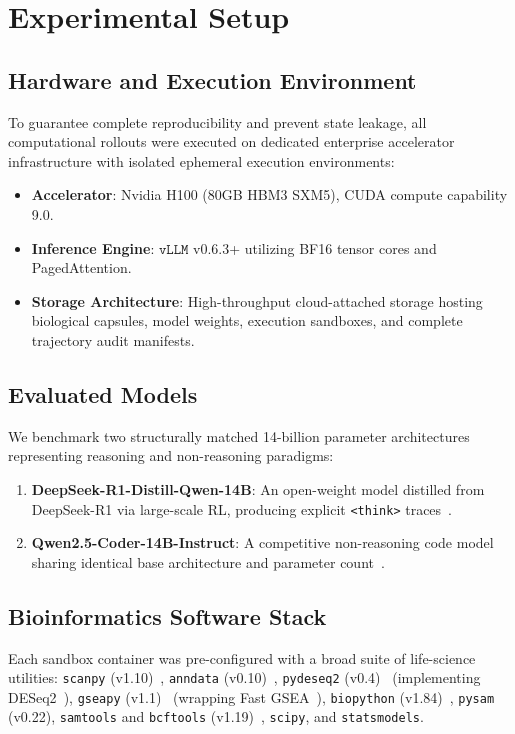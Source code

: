 \documentclass[11pt,letterpaper]{article}
\begin{document}
\section{Experimental Setup}

\subsection{Hardware and Execution Environment}
To guarantee complete reproducibility and prevent state leakage, all computational rollouts were executed on dedicated enterprise accelerator infrastructure with isolated ephemeral execution environments:
\begin{itemize}
    \item \textbf{Accelerator}: Nvidia H100 (80GB HBM3 SXM5), CUDA compute capability 9.0.
    \item \textbf{Inference Engine}: $\texttt{vLLM}$ v0.6.3+ utilizing BF16 tensor cores and PagedAttention.
    \item \textbf{Storage Architecture}: High-throughput cloud-attached storage hosting biological capsules, model weights, execution sandboxes, and complete trajectory audit manifests.
\end{itemize}

\subsection{Evaluated Models}
We benchmark two structurally matched 14-billion parameter architectures representing reasoning and non-reasoning paradigms:
\begin{enumerate}
    \item \textbf{DeepSeek-R1-Distill-Qwen-14B}: An open-weight model distilled from DeepSeek-R1 via large-scale RL, producing explicit \texttt{<think>} traces~\cite{guo2025deepseek}.
    \item \textbf{Qwen2.5-Coder-14B-Instruct}: A competitive non-reasoning code model sharing identical base architecture and parameter count~\cite{qwen2024coder}.
\end{enumerate}

\subsection{Bioinformatics Software Stack}
Each sandbox container was pre-configured with a broad suite of life-science utilities: \texttt{scanpy} (v1.10)~\cite{wolf2018scanpy}, \texttt{anndata} (v0.10)~\cite{virshup2021anndata}, \texttt{pydeseq2} (v0.4)~\cite{muzellec2023pydeseq2} (implementing DESeq2~\cite{love2014deseq2}), \texttt{gseapy} (v1.1)~\cite{fang2023gseapy} (wrapping Fast GSEA~\cite{korotkevich2021fast}), \texttt{biopython} (v1.84)~\cite{cock2009biopython}, \texttt{pysam} (v0.22), \texttt{samtools} and \texttt{bcftools} (v1.19)~\cite{danecek2021samtools}, \texttt{scipy}, and \texttt{statsmodels}.
\end{document}

